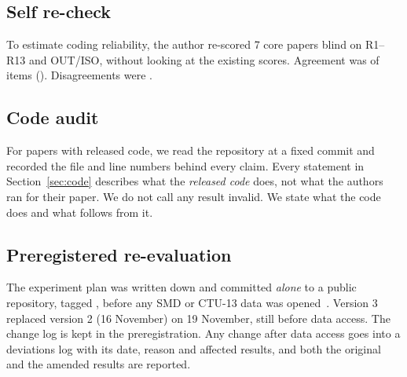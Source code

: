 \subsection{Self re-check}
\label{sec:recheck}
To estimate coding reliability, the author re-scored 7 core papers blind on R1--R13 and OUT/ISO, without looking at the existing scores. Agreement was  of items (). Disagreements were .

\subsection{Code audit}
\label{sec:codemethod}
For papers with released code, we read the repository at a fixed commit and recorded the file and line numbers behind every claim. Every statement in Section~\ref{sec:code} describes what the \emph{released code} does, not what the authors ran for their paper. We do not call any result invalid. We state what the code does and what follows from it.

\subsection{Preregistered re-evaluation}
\label{sec:prereg}
The experiment plan was written down and committed \emph{alone} to a public repository, tagged , before any SMD or CTU-13 data was opened~\cite{nosek2018prereg}.  Version 3 replaced version 2 (16 November) on 19 November, still before data access. The change log is kept in the preregistration. Any change after data access goes into a deviations log with its date, reason and affected results, and both the original and the amended results are reported.

